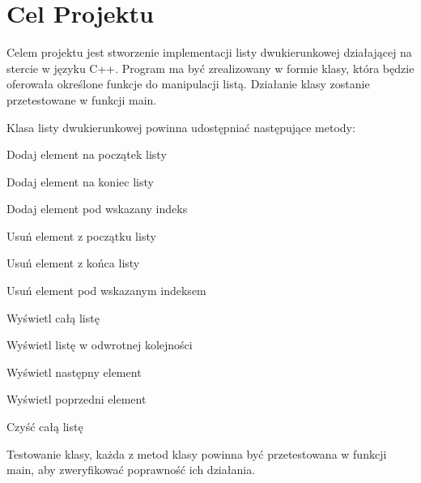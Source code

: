 \chapter{Cel Projektu}
\label{md__c_1_2gry_2_lista_2_r_e_a_d_m_e}
\label{md__c_1_2gry_2_lista_2_r_e_a_d_m_e_autotoc_md0}%


Celem projektu jest stworzenie implementacji listy dwukierunkowej działającej na stercie w języku C++. Program ma być zrealizowany w formie klasy, która będzie oferowała określone funkcje do manipulacji listą. Działanie klasy zostanie przetestowane w funkcji main.

Klasa listy dwukierunkowej powinna udostępniać następujące metody\+:


\begin{DoxyItemize}
\item Dodaj element na początek listy
\item Dodaj element na koniec listy
\item Dodaj element pod wskazany indeks
\item Usuń element z początku listy
\item Usuń element z końca listy
\item Usuń element pod wskazanym indeksem
\item Wyświetl całą listę
\item Wyświetl listę w odwrotnej kolejności
\item Wyświetl następny element
\item Wyświetl poprzedni element
\item Czyść całą listę
\item Testowanie klasy, każda z metod klasy powinna być przetestowana w funkcji main, aby zweryfikować poprawność ich działania. 
\end{DoxyItemize}